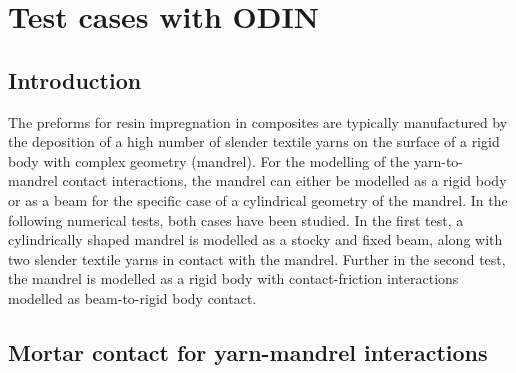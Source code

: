 \section{Test cases with ODIN}\label{sec:testcasesodin}
\subsection{Introduction}

The preforms for resin impregnation in composites are typically manufactured by the deposition of a high number of slender textile yarns on the surface of a rigid body with complex geometry (mandrel). For the modelling of the yarn-to-mandrel contact interactions, the mandrel can either be modelled as a rigid body or as a beam for the specific case of a cylindrical geometry of the mandrel. In the following numerical tests, both cases have been studied. In the first test, a cylindrically shaped mandrel is modelled as a stocky and fixed beam, along with two slender textile yarns in contact with the mandrel. Further in the second test, the mandrel is modelled as a rigid body with contact-friction interactions modelled as beam-to-rigid body contact.

\subsection{Mortar contact for yarn-mandrel interactions}
